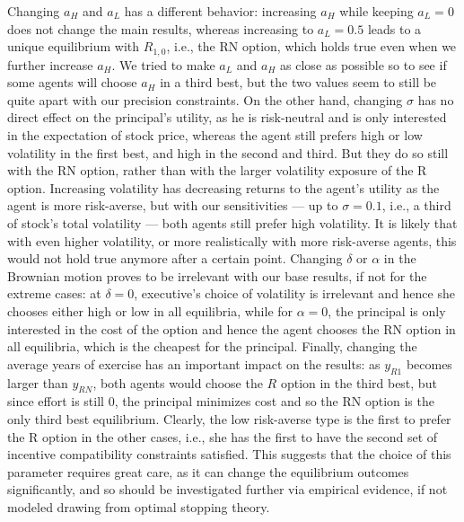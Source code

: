 Changing $a_H$ and $a_L$ has a different behavior: increasing $a_H$ while keeping $a_L=0$ does not change the main results, whereas increasing to $a_L=0.5$ leads to a unique equilibrium with $R_{1,0}$, i.e., the RN option, which holds true even when we further increase $a_H$. We tried to make $a_L$ and $a_H$ as close as possible so to see if some agents will choose $a_H$ in a third best, but the two values seem to still be quite apart with our precision constraints. On the other hand, changing $\sigma$ has no direct effect on the principal's utility, as he is risk-neutral and is only interested in the expectation of stock price, whereas the agent still prefers high or low volatility in the first best, and high in the second and third. But they do so still with the RN option, rather than with the larger volatility exposure of the R option. Increasing volatility has decreasing returns to the agent's utility as the agent is more risk-averse, but with our sensitivities --- up to $\sigma = 0.1$, i.e., a third of stock's total volatility --- both agents still prefer high volatility. It is likely that with even higher volatility, or more realistically with more risk-averse agents, this would not hold true anymore after a certain point. Changing $\delta$ or $\alpha$ in the Brownian motion proves to be irrelevant with our base results, if not for the extreme cases: at $\delta = 0$, executive's choice of volatility is irrelevant and hence she chooses either high or low in all equilibria, while for $\alpha = 0$, the principal is only interested in the cost of the option and hence the agent chooses the RN option in all equilibria, which is the cheapest for the principal. Finally, changing the average years of exercise has an important impact on the results: as $y_{R1}$ becomes larger than $y_{RN}$, both agents would choose the $R$ option in the third best, but since effort is still 0, the principal minimizes cost and so the RN option is the only third best equilibrium. Clearly, the low risk-averse type is the first to prefer the R option in the other cases, i.e., she has the first to have the second set of incentive compatibility constraints satisfied. This suggests that the choice of this parameter requires great care, as it can change the equilibrium outcomes significantly, and so should be investigated further via empirical evidence, if not modeled drawing from optimal stopping theory. 

